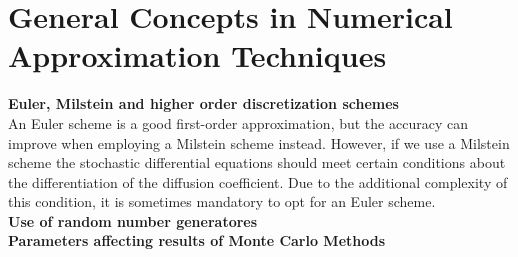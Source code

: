 
\section{General Concepts in Numerical Approximation Techniques}

\textbf{Euler, Milstein and higher order discretization schemes}\\
An Euler scheme is a good first-order approximation, but the  accuracy can improve when employing a Milstein scheme instead. However, if we use a Milstein scheme the stochastic differential equations should meet certain conditions about the differentiation of the diffusion coefficient. Due to the additional complexity of this condition, it is sometimes mandatory to opt for an Euler scheme.\\


\textbf{Use of random number generatores}\\

\textbf{Parameters affecting results of Monte Carlo Methods}